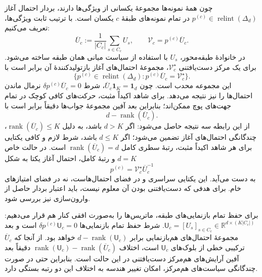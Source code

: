 چون همهٔ نمونه‌ها مجموعهٔ یکسانی از ویژگی‌ها دارند، بردار احتمال آغاز $p^{(c)}\in\operatorname{relint}(\Delta_d)$ در تمام نمونه‌های طبقهٔ $c$ یکسان است. با ترتیب ثابت ویژگی‌ها، تعریف می‌کنیم:
\begin{equation}\label{cmp:eq:ch3-geometry-fixed-start-average-U}
\overline U_c:=\frac{1}{|C_c|}\sum_{s\in C_c}U_s,\qquad
\mathcal V_c=p^{(c)}\overline U_c.
\end{equation}
در خانوادهٔ طبقه‌محور، $U_s$ با استفاده از سیاست میانی همان طبقه ساخته می‌شود. برای یک مرکز دست‌یافتنی $\mathcal V_c^\star$، مجموعهٔ احتمال‌های آغاز بازتولیدکنندهٔ آن برابر است با
\begin{equation}\label{cmp:eq:ch3-geometry-fixed-start-center-fiber}
\{p^{(c)}\in\operatorname{relint}(\Delta_d):p^{(c)}\overline U_c=\mathcal V_c^\star\}.
\end{equation}
این مجموعه محدب است. چون $\overline U_c\mathbf1_K=\mathbf1_d$، شرط $\delta p^{(c)}\overline U_c=0$ نرمال ماندن احتمال‌ها را نیز نتیجه می‌دهد. برای شاهد اکیداً مثبت، حرکت‌های کافی کوچک در تمام جهت‌های پوچ ممکن‌اند؛ بنابراین بعد آفین مجموعهٔ جواب‌ها دقیقاً برابر است با
\begin{equation}\label{cmp:eq:ch3-geometry-fixed-start-center-dim}
\boxed{d-\operatorname{rank}(\overline U_c).}
\end{equation}
از این رابطه سه نتیجه حاصل می‌شود: اگر $d>K$ باشد، به دلیل $\operatorname{rank}(\overline U_c)\le K$، چندگانگی احتمال‌های آغاز تضمین می‌شود؛ اگر $d\le K$ باشد، شرط لازم و کافی یکتایی برای هر شاهد اکیداً مثبت، رتبهٔ سطری کامل $\operatorname{rank}(\overline U_c)=d$ است. در حالت خاص $d=K$ و رتبهٔ کامل، احتمال آغاز یکتا به شکل
\begin{equation}\label{cmp:eq:ch3-geometry-fixed-start-inverse}
p^{(c)}=\mathcal V_c^\star\overline U_c^{-1}
\end{equation}
به دست می‌آید. این یکتایی سراسری و در فضای احتمال‌هاست، نه در فضای امتیازهای خام. برای هدفی که دست‌یافتنی بودن آن معلوم نیست، باید اعتبار بردار حاصل از وارون‌سازی نیز بررسی شود.

برای حفظ تمام بازنمایی‌های طبقه، ماتریس‌ها را به‌صورت افقی کنار هم قرار می‌دهیم: $\mathsf U_c=[U_s]_{s\in C_c}\in\mathbb R^{d\times (K|C_c|)}$. شرط حفظ تمام بازنمایی‌ها $\delta p^{(c)}\mathsf U_c=0$ است و بعد مجموعهٔ احتمال‌های هم‌بازنمایی برابر $d-\operatorname{rank}(\mathsf U_c)$ خواهد بود. از آنجا که $\overline U_c$ ترکیبی خطی از بلوک‌های $\mathsf U_c$ است، اختلاف $\operatorname{rank}(\mathsf U_c)-\operatorname{rank}(\overline U_c)$ دقیقاً بعد آفین آرایش‌های هم‌مرکز دست‌یافتنی در این حالت است. بنابراین حتی در صورت چندگانگی سیاست‌های هم‌مرکز، امکان تغییر هندسه به اختلاف این دو رتبه بستگی دارد.

